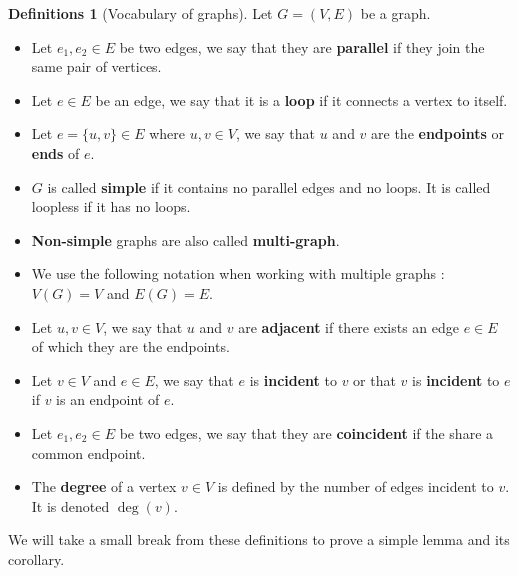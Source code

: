 \documentclass{tufte-handout}
\newcommand{\bra}[1]{\left(#1\right)}
\theoremstyle{definition}
\newtheorem{defns}[thm]{Definitions}
\theoremstyle{remark}
\begin{document}
\begin{defns}[Vocabulary of graphs]
	Let $G = (V,E)$ be a graph.
	\begin{itemize}
		\item Let $e_1,e_2 \in E$ be two edges, we say that they are \textbf{parallel} if they join the same pair of vertices.
		\item Let $e \in E$ be an edge, we say that it is a \textbf{loop} if it connects a vertex to itself.
		\item Let $e = \{u,v\} \in E$ where $u,v \in V$, we say that $u$ and $v$ are the \textbf{endpoints} or \textbf{ends} of $e$.
		\item $G$ is called \textbf{simple} if it contains no parallel edges and no loops. It is called loopless if it has no loops.
		\item \textbf{Non-simple} graphs are also called \textbf{multi-graph}.
		\item We use the following notation when working with multiple graphs : $V(G) = V$ and $E(G) = E$.
		\item Let $u,v \in V$, we say that $u$ and $v$ are \textbf{adjacent} if there exists an edge $e \in E$ of which they are the endpoints.
		\item Let $v \in V$ and $e \in E$, we say that $e$ is \textbf{incident} to $v$ or that $v$ is \textbf{incident} to $e$ if $v$ is an endpoint of $e$.
		\item Let $e_1, e_2 \in E$ be two edges, we say that they are \textbf{coincident} if the share a common endpoint.
		\item The \textbf{degree} of a vertex $v \in V$ is defined by the number of edges incident to $v$. It is denoted $\deg{\bra{v}}$.
	\end{itemize}
\end{defns}

We will take a small break from these definitions to prove a simple lemma and its corollary.
\end{document}
